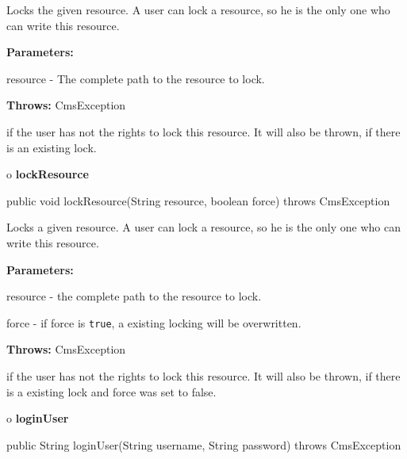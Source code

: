 \begin{description}
\htmlDD Locks the given resource. \htmlBR
A user can lock a resource, so he is the only one who can write this resource.


\begin{description}
\item {\bf Parameters:}  

resource - The complete path to the resource to lock.  
\item {\bf Throws:} CmsException  

if the user has not the rights to lock this resource. It will also be thrown,
if there is an existing lock.  
\end{description}

\end{description}

o {\bf lockResource} 

\begin{PRE}
 public void lockResource(String resource,
                          boolean force) throws CmsException
\end{PRE}

\begin{description}
\htmlDD Locks a given resource. \htmlBR
A user can lock a resource, so he is the only one who can write this resource.


\begin{description}
\item {\bf Parameters:}  

resource - the complete path to the resource to lock.  

force - if force is {\tt true}, a existing locking will be overwritten.  
\item {\bf Throws:} CmsException  

if the user has not the rights to lock this resource. It will also be thrown,
if there is a existing lock and force was set to false.  
\end{description}

\end{description}

o {\bf loginUser} 

\begin{PRE}
 public String loginUser(String username,
                         String password) throws CmsException
\end{PRE}

